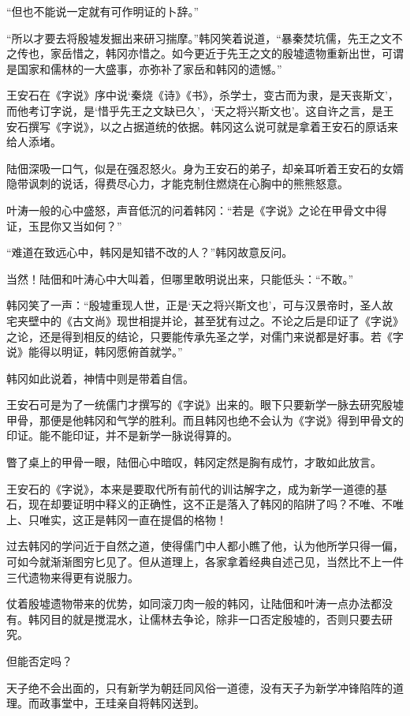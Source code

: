 “但也不能说一定就有可作明证的卜辞。”

“所以才要去将殷墟发掘出来研习揣摩。”韩冈笑着说道，“暴秦焚坑儒，先王之文不之传也，家岳惜之，韩冈亦惜之。如今更近于先王之文的殷墟遗物重新出世，可谓是国家和儒林的一大盛事，亦弥补了家岳和韩冈的遗憾。”

王安石在《字说》序中说‘秦烧《诗》《书》，杀学士，变古而为隶，是天丧斯文’，而他考订字说，是‘惜乎先王之文缺已久’，‘天之将兴斯文也’。这自许之言，是王安石撰写《字说》，以之占据道统的依据。韩冈这么说可就是拿着王安石的原话来给人添堵。

陆佃深吸一口气，似是在强忍怒火。身为王安石的弟子，却亲耳听着王安石的女婿隐带讽刺的说话，得费尽心力，才能克制住燃烧在心胸中的熊熊怒意。

叶涛一般的心中盛怒，声音低沉的问着韩冈：“若是《字说》之论在甲骨文中得证，玉昆你又当如何？”

“难道在致远心中，韩冈是知错不改的人？”韩冈故意反问。

当然！陆佃和叶涛心中大叫着，但哪里敢明说出来，只能低头：“不敢。”

韩冈笑了一声：“殷墟重现人世，正是‘天之将兴斯文也’，可与汉景帝时，圣人故宅夹壁中的《古文尚》现世相提并论，甚至犹有过之。不论之后是印证了《字说》之论，还是得到相反的结论，只要能传承先圣之学，对儒门来说都是好事。若《字说》能得以明证，韩冈愿俯首就学。”

韩冈如此说着，神情中则是带着自信。

王安石可是为了一统儒门才撰写的《字说》出来的。眼下只要新学一脉去研究殷墟甲骨，那便是他韩冈和气学的胜利。而且韩冈也绝不会认为《字说》得到甲骨文的印证。能不能印证，并不是新学一脉说得算的。

瞥了桌上的甲骨一眼，陆佃心中暗叹，韩冈定然是胸有成竹，才敢如此放言。

王安石的《字说》，本来是要取代所有前代的训诂解字之，成为新学一道德的基石，现在却要证明中释义的正确性，这不正是落入了韩冈的陷阱了吗？不唯、不唯上、只唯实，这正是韩冈一直在提倡的格物！

过去韩冈的学问近于自然之道，使得儒门中人都小瞧了他，认为他所学只得一偏，可如今就渐渐图穷匕见了。但从道理上，各家拿着经典自述己见，当然比不上一件三代遗物来得更有说服力。

仗着殷墟遗物带来的优势，如同滚刀肉一般的韩冈，让陆佃和叶涛一点办法都没有。韩冈目的就是搅混水，让儒林去争论，除非一口否定殷墟的，否则只要去研究。

但能否定吗？

天子绝不会出面的，只有新学为朝廷同风俗一道德，没有天子为新学冲锋陷阵的道理。而政事堂中，王珪亲自将韩冈送到。


